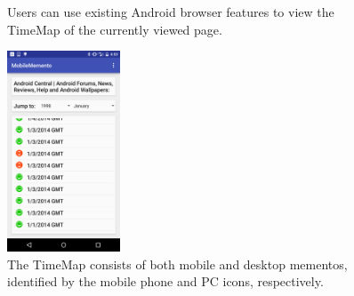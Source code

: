 \documentclass{sig-alternate}
\begin{document}
\begin{figure}
  \begin{center}
    \qquad
  \end{center}
  \caption{Users can use existing Android browser features to view the TimeMap of the currently viewed page.}
  \label{clicks}
\end{figure}

\begin{figure}
  \begin{center}
    	\includegraphics[width=0.3\textwidth]{./imgs/timemap.png}
  \end{center}
  \caption{The TimeMap consists of both mobile and desktop mementos, identified by the mobile phone and PC icons, respectively.}
  \label{tm}
\end{figure}
\end{document}
